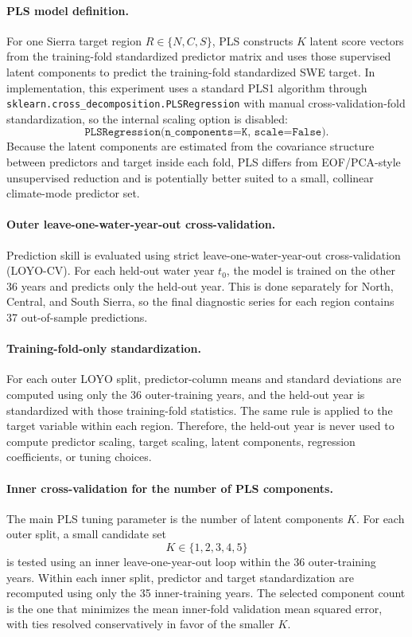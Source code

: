 \documentclass[11pt]{article}
\begin{document}
\paragraph{PLS model definition.}
For one Sierra target region $R\in\{N,C,S\}$, PLS constructs $K$ latent score vectors from the
training-fold standardized predictor matrix and uses those supervised latent components to predict
the training-fold standardized SWE target. In implementation, this experiment uses a standard
PLS1 algorithm through \texttt{sklearn.cross\_decomposition.PLSRegression} with manual
cross-validation-fold standardization, so the internal scaling option is disabled:
\[
\texttt{PLSRegression(n\_components=K, scale=False)}.
\]
Because the latent components are estimated from the covariance structure between predictors and
target inside each fold, PLS differs from EOF/PCA-style unsupervised reduction and is potentially
better suited to a small, collinear climate-mode predictor set.

\paragraph{Outer leave-one-water-year-out cross-validation.}
Prediction skill is evaluated using strict leave-one-water-year-out cross-validation (LOYO-CV). For
each held-out water year $t_0$, the model is trained on the other 36 years and predicts only the
held-out year. This is done separately for North, Central, and South Sierra, so the final
diagnostic series for each region contains 37 out-of-sample predictions.

\paragraph{Training-fold-only standardization.}
For each outer LOYO split, predictor-column means and standard deviations are computed using only
the 36 outer-training years, and the held-out year is standardized with those training-fold
statistics. The same rule is applied to the target variable within each region. Therefore, the
held-out year is never used to compute predictor scaling, target scaling, latent components,
regression coefficients, or tuning choices.

\paragraph{Inner cross-validation for the number of PLS components.}
The main PLS tuning parameter is the number of latent components $K$. For each outer split, a
small candidate set
\[
K\in\{1,2,3,4,5\}
\]
is tested using an inner leave-one-year-out loop within the 36 outer-training years. Within each
inner split, predictor and target standardization are recomputed using only the 35 inner-training
years. The selected component count is the one that minimizes the mean inner-fold validation mean
squared error, with ties resolved conservatively in favor of the smaller $K$.
\end{document}
